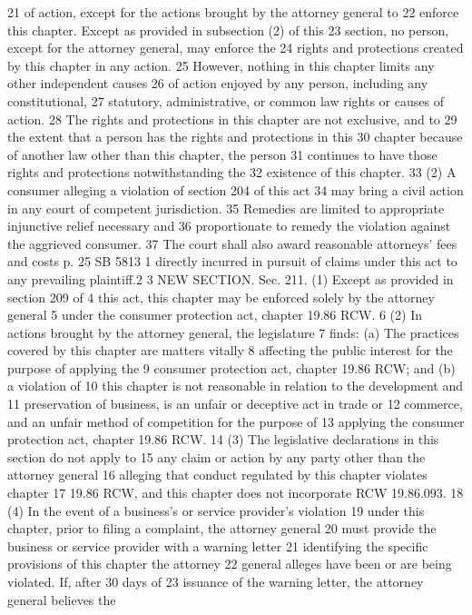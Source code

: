 21 of action, except for the actions brought by the attorney general to
22 enforce this chapter. Except as provided in subsection (2) of this
23 section, no person, except for the attorney general, may enforce the
24 rights and protections created by this chapter in any action.
25 However, nothing in this chapter limits any other independent causes
26 of action enjoyed by any person, including any constitutional,
27 statutory, administrative, or common law rights or causes of action.
28 The rights and protections in this chapter are not exclusive, and to
29 the extent that a person has the rights and protections in this
30 chapter because of another law other than this chapter, the person
31 continues to have those rights and protections notwithstanding the
32 existence of this chapter.
33 (2) A consumer alleging a violation of section 204 of this act
34 may bring a civil action in any court of competent jurisdiction.
35 Remedies are limited to appropriate injunctive relief necessary and
36 proportionate to remedy the violation against the aggrieved consumer.
37 The court shall also award reasonable attorneys' fees and costs
p. 25 SB 5813
1 directly incurred in pursuit of claims under this act to any
prevailing plaintiff.2
3 NEW SECTION. Sec. 211. (1) Except as provided in section 209 of
4 this act, this chapter may be enforced solely by the attorney general
5 under the consumer protection act, chapter 19.86 RCW.
6 (2) In actions brought by the attorney general, the legislature
7 finds: (a) The practices covered by this chapter are matters vitally
8 affecting the public interest for the purpose of applying the
9 consumer protection act, chapter 19.86 RCW; and (b) a violation of
10 this chapter is not reasonable in relation to the development and
11 preservation of business, is an unfair or deceptive act in trade or
12 commerce, and an unfair method of competition for the purpose of
13 applying the consumer protection act, chapter 19.86 RCW.
14 (3) The legislative declarations in this section do not apply to
15 any claim or action by any party other than the attorney general
16 alleging that conduct regulated by this chapter violates chapter
17 19.86 RCW, and this chapter does not incorporate RCW 19.86.093.
18 (4) In the event of a business's or service provider's violation
19 under this chapter, prior to filing a complaint, the attorney general
20 must provide the business or service provider with a warning letter
21 identifying the specific provisions of this chapter the attorney
22 general alleges have been or are being violated. If, after 30 days of
23 issuance of the warning letter, the attorney general believes the
